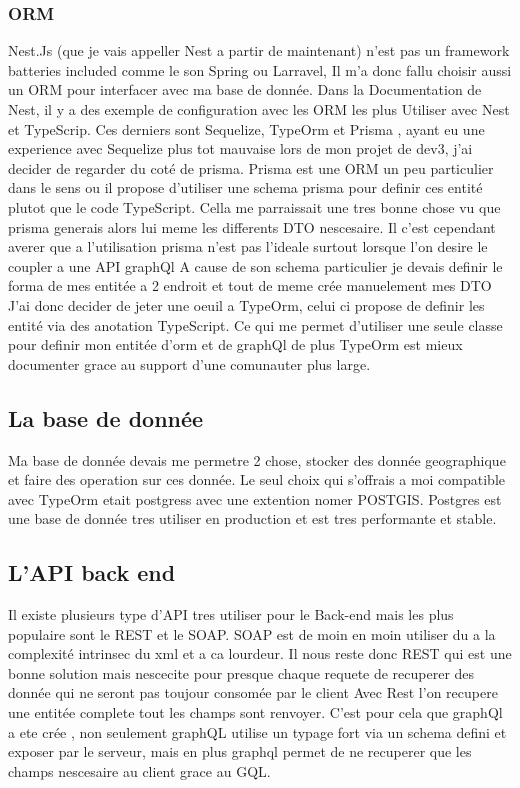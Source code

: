 \subsubsection{ORM}
Nest.Js (que je vais appeller Nest a partir de maintenant) n'est pas un framework batteries included comme le son Spring ou Larravel,
Il m'a donc fallu choisir aussi un ORM pour interfacer avec ma base de donnée.
Dans la Documentation de Nest, il y a des exemple de configuration avec les ORM les plus Utiliser avec Nest et TypeScrip.
Ces derniers sont Sequelize, TypeOrm et Prisma ,
ayant eu une experience avec Sequelize plus tot mauvaise lors de mon projet de dev3, j'ai decider de regarder du coté de prisma.
Prisma est une ORM un peu particulier dans le sens ou il propose d'utiliser une schema prisma pour definir ces entité plutot que le code TypeScript.
Cella me parraissait une tres bonne chose vu que prisma generais alors lui meme les differents DTO nescesaire.
Il c'est cependant averer que a l'utilisation prisma n'est pas l'ideale surtout lorsque l'on desire le coupler a une API graphQl
A cause de son schema particulier je devais definir le forma de mes entitée a 2 endroit et tout de meme crée manuelement mes DTO
J'ai donc decider de jeter une oeuil a TypeOrm, celui ci propose de definir les entité via des anotation TypeScript.
Ce qui me permet d'utiliser une seule classe pour definir mon entitée d'orm et de graphQl de plus TypeOrm est mieux
documenter grace au support d'une comunauter plus large.


\subsection{La base de donnée}\label{subsec:la-base-de-donnee}
Ma base de donnée devais me permetre 2 chose, stocker des donnée geographique et faire des operation sur ces donnée.
Le seul choix qui s'offrais a moi compatible avec TypeOrm etait postgress avec une extention nomer POSTGIS.
Postgres est une base de donnée tres utiliser en production et est tres performante et stable.

\subsection{L'API back end}\label{subsec:l'api-back-end}
Il existe plusieurs type d'API tres utiliser pour le Back-end mais les plus populaire sont le REST et le SOAP.
SOAP est de moin en moin utiliser du a la complexité intrinsec du xml et a ca lourdeur.
Il nous reste donc REST qui est une bonne solution mais nescecite pour presque chaque requete de recuperer des donnée qui ne seront pas toujour consomée par le client
Avec Rest l'on recupere une entitée complete tout les champs sont renvoyer.
C'est pour cela que graphQl a ete crée , non seulement graphQL utilise un typage fort via un schema defini et exposer par le serveur,
mais en plus graphql permet de ne recuperer que les champs nescesaire au client grace au GQL.




